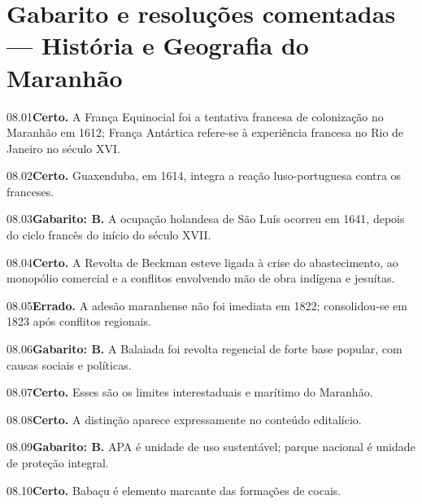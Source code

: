 \section{Gabarito e resoluções comentadas — História e Geografia do Maranhão}

\begin{solucao}{08.01}\textbf{Certo.} A França Equinocial foi a tentativa francesa de colonização no Maranhão em 1612; França Antártica refere-se à experiência francesa no Rio de Janeiro no século XVI.\end{solucao}
\begin{solucao}{08.02}\textbf{Certo.} Guaxenduba, em 1614, integra a reação luso-portuguesa contra os franceses.\end{solucao}
\begin{solucao}{08.03}\textbf{Gabarito: B.} A ocupação holandesa de São Luís ocorreu em 1641, depois do ciclo francês do início do século XVII.\end{solucao}
\begin{solucao}{08.04}\textbf{Certo.} A Revolta de Beckman esteve ligada à crise do abastecimento, ao monopólio comercial e a conflitos envolvendo mão de obra indígena e jesuítas.\end{solucao}
\begin{solucao}{08.05}\textbf{Errado.} A adesão maranhense não foi imediata em 1822; consolidou-se em 1823 após conflitos regionais.\end{solucao}
\begin{solucao}{08.06}\textbf{Gabarito: B.} A Balaiada foi revolta regencial de forte base popular, com causas sociais e políticas.\end{solucao}
\begin{solucao}{08.07}\textbf{Certo.} Esses são os limites interestaduais e marítimo do Maranhão.\end{solucao}
\begin{solucao}{08.08}\textbf{Certo.} A distinção aparece expressamente no conteúdo editalício.\end{solucao}
\begin{solucao}{08.09}\textbf{Gabarito: B.} APA é unidade de uso sustentável; parque nacional é unidade de proteção integral.\end{solucao}
\begin{solucao}{08.10}\textbf{Certo.} Babaçu é elemento marcante das formações de cocais.\end{solucao}

